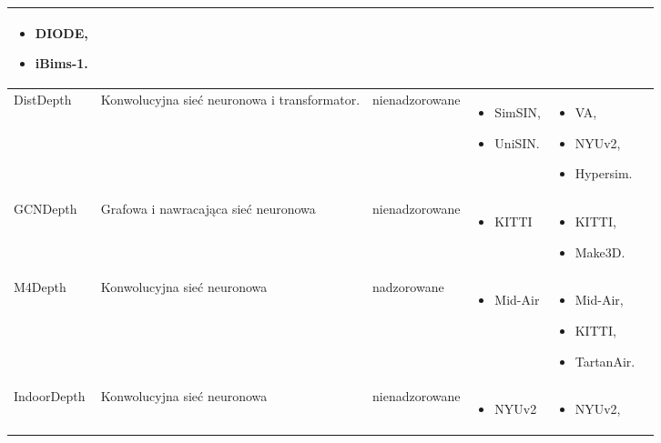 \begin{table}[H]
{\begin{tabular}{ |l|p{2cm}|p{3cm}|p{5cm}|p{5cm}|r| }
\begin{itemize}
            \item DIODE,
            \item iBims-1.
        \end{itemize}\\
        \hline
        DistDepth &
        Konwolucyjna sieć neuronowa i transformator. &
        nienadzorowane &
        \begin{itemize}
            \item SimSIN,
            \item UniSIN.
        \end{itemize} & 
        \begin{itemize}
            \item VA,
            \item NYUv2,
            \item Hypersim.
        \end{itemize}\\
        \hline
        GCNDepth &
        Grafowa i nawracająca sieć neuronowa &
        nienadzorowane &
        \begin{itemize}
            \item KITTI
        \end{itemize} & 
        \begin{itemize}
            \item KITTI,
            \item Make3D.
        \end{itemize}\\
        \hline
        M4Depth &
        Konwolucyjna sieć neuronowa &
        nadzorowane &
        \begin{itemize}
            \item Mid-Air
        \end{itemize} & 
        \begin{itemize}
            \item Mid-Air,
            \item KITTI,
            \item TartanAir.
        \end{itemize}\\
        \hline
        IndoorDepth &
        Konwolucyjna sieć neuronowa &
        nienadzorowane &
        \begin{itemize}
            \item NYUv2
        \end{itemize} & 
        \begin{itemize}
            \item NYUv2,

\end{itemize}
\end{tabular}}
\end{table}
